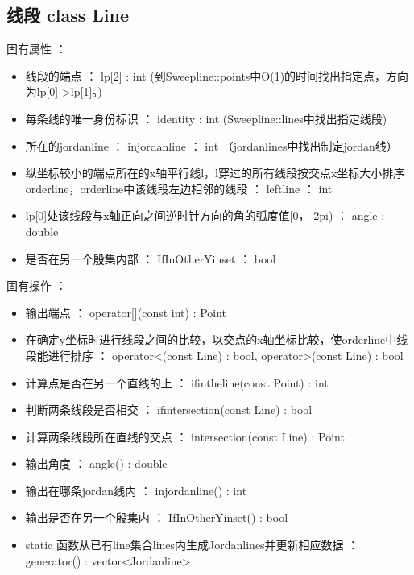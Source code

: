 \documentclass[a4paper]{book}
\numberwithin{equation}{chapter}
\theoremstyle{definition}
\begin{document}
\subsection{线段 class Line}
固有属性 ：
\begin{itemize}
	\item  线段的端点 ： lp[2] : int   (到Sweepline::points中O(1)的时间找出指定点，方向为lp[0]->lp[1]。)
	\item  每条线的唯一身份标识  ： identity : int  (Sweepline::lines中找出指定线段)
	\item  所在的jordanline  ： injordanline  ： int  （jordanlines中找出制定jordan线）
	\item  纵坐标较小的端点所在的x轴平行线l，l穿过的所有线段按交点x坐标大小排序orderline，orderline中该线段左边相邻的线段  ： leftline  ： int
	\item  lp[0]处该线段与x轴正向之间逆时针方向的角的弧度值[0， 2pi)  ： angle : double
	\item  是否在另一个殷集内部  ： IfInOtherYinset  ： bool
\end{itemize}
固有操作 ：
\begin{itemize}
	\item  输出端点 ： operator[](const int) : Point
	\item  在确定y坐标时进行线段之间的比较，以交点的x轴坐标比较，使orderline中线段能进行排序 ： operator<(const Line) : bool, operator>(const Line) : bool
	\item  计算点是否在另一个直线的上 ： ifintheline(const Point) : int
	\item  判断两条线段是否相交 ： ifintersection(const Line) : bool
	\item  计算两条线段所在直线的交点 ： intersection(const Line) : Point
	\item  输出角度 ： angle() : double
	\item  输出在哪条jordan线内 ： injordanline() : int
	\item  输出是否在另一个殷集内 ： IfInOtherYinset() : bool
	\item  static 函数从已有line集合lines内生成Jordanlines并更新相应数据 ： generator() : vector<Jordanline>
\end{itemize}
\end{document}
